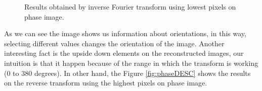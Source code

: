 \documentclass[12pt,a4paper]{article}
\begin{document}
\begin{itemize}
\begin{figure}[!h]
{{			}
			\label{fig:phaseinc25}
		}
		\quad
		\quad
		
		\caption{Results obtained by inverse Fourier transform using lowest pixels on phase image.}
		\label{fig:phaseINC}
	\end{figure}
	
	As we can see the image shows us information about orientations, in this way, selecting different values changes the orientation of the image. Another interesting fact is the upside down elements on the reconstructed images, our intuition is that it happen because of the range in which the transform is working (0 to 380 degrees). In other hand, the Figure \ref{fig:phaseDESC} shows the results on the reverse transform using the highest pixels on phase image. \\
	

\end{itemize}
\end{document}
